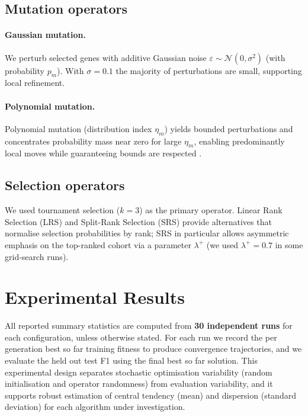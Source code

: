 \documentclass[12pt, a4paper]{article}
\begin{document}
\subsection{Mutation operators}
\paragraph{Gaussian mutation.} We perturb selected genes with additive Gaussian noise $\varepsilon\sim\mathcal{N}(0,\sigma^2)$ (with probability $p_m$). With $\sigma=0.1$ the majority of perturbations are small, supporting local refinement.

\paragraph{Polynomial mutation.} Polynomial mutation (distribution index $\eta_m$) yields bounded perturbations and concentrates probability mass near zero for large $\eta_m$, enabling predominantly local moves while guaranteeing bounds are respected \cite{polymut}.

\subsection{Selection operators}
We used tournament selection ($k=3$) as the primary operator. Linear Rank Selection (LRS) and Split-Rank Selection (SRS) provide alternatives that normalise selection probabilities by rank; SRS in particular allows asymmetric emphasis on the top-ranked cohort via a parameter $\lambda^+$ (we used $\lambda^+=0.7$ in some grid-search runs).


\section{Experimental Results}

All reported summary statistics are computed from \textbf{30 independent runs} for each configuration, unless otherwise stated. For each run we record the per generation best so far training fitness to produce convergence trajectories, and we evaluate the held out test F1 using the final best so far solution. This experimental design separates stochastic optimisation variability (random initialisation and operator randomness) from evaluation variability, and it supports robust estimation of central tendency (mean) and dispersion (standard deviation) for each algorithm under investigation.
\end{document}

